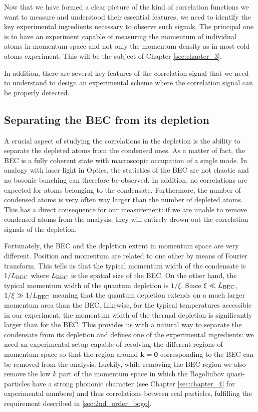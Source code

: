 Now that we have formed a clear picture of the kind of correlation functions we want to measure and understood their essential features, we need to identify the key experimental ingredients necessary to observe such signals. The principal one is to have an experiment capable of measuring the momentum of individual atoms in momentum space and not only the momentum density as in most cold atoms experiment. This will be the subject of Chapter \ref{sec:chapter_3}. 

In addition, there are several key features of the \kmk correlation signal that we need to understand to design an experimental scheme where the \kmk correlation signal can be properly detected.

\subsection{Separating the BEC from its depletion}

A crucial aspect of studying the correlations in the depletion is the ability to separate the depleted atoms from the condensed ones. As a matter of fact, the BEC is a fully coherent state with macroscopic occupation of a single mode. In analogy with laser light in Optics, the statistics of the BEC are not chaotic and no bosonic bunching can therefore be observed. In addition, no \kmk correlations are expected for atoms belonging to the condensate. Furthermore, the number of condensed atoms is very often way larger than the number of depleted atoms. This has a direct consequence for our measurement: if we are unable to remove condensed atoms from the analysis, they will entirely drown out the correlation signals of the depletion.

Fortunately, the BEC and the depletion extent in momentum space are very different. Position and momentum are related to one other by means of Fourier transform. This tells us that the typical momentum width of the condensate is $1/L_{\rm{BEC}}$ \cite{stenger1999} where $L_{\rm{BEC}}$ is the spatial size of the BEC. On the other hand, the typical momentum width of the quantum depletion is $1/\xi$. Since $\xi \ll L_{\rm{BEC}}$, $1/\xi \gg 1/L_{\rm{BEC}}$ meaning that the quantum depletion extends on a much larger momentum area than the BEC. Likewise, for the typical temperatures accessible in our experiment, the momentum width of the thermal depletion is significantly larger than for the BEC. This provides us with a natural way to separate the condensate from its depletion and defines one of the experimental ingredients: we need an experimental setup capable of resolving the different regions of momentum space so that the region around $\bm{k}=\bm{0}$ corresponding to the BEC can be removed from the analysis. Luckily, while removing the BEC region we also remove the low $k$ part of the momentum space in which the Bogoliubov quasi-particles have a strong phononic character (see Chapter \ref{sec:chapter_4} for experimental numbers) and thus \kmk correlations between real particles, fulfilling the requirement described in \ref{sec:2nd_order_bogo}.


